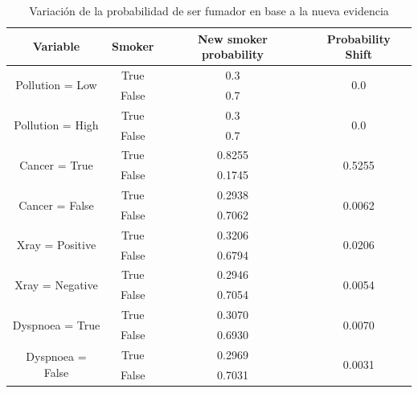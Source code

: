 \begin{table}[ht]
    \centering
    \begin{tabular}{|c|c|c|c|}
        \hline
        \textbf{Variable} & \textbf{Smoker} & \textbf{New smoker probability} & \textbf{Probability Shift} \\
        \hline
        \multirow{2}{*}{Pollution = Low} & True  & 0.3 & \multirow{2}{*}{0.0} \\
                                         & False & 0.7 & \\
        \hline
        \multirow{2}{*}{Pollution = High} & True  & 0.3 & \multirow{2}{*}{0.0} \\
                                          & False & 0.7 & \\
        \hline
        \multirow{2}{*}{Cancer = True} & True  & 0.8255 & \multirow{2}{*}{0.5255} \\
                                       & False & 0.1745 & \\
        \hline
        \multirow{2}{*}{Cancer = False} & True  & 0.2938 & \multirow{2}{*}{0.0062} \\
                                        & False & 0.7062 & \\
        \hline
        \multirow{2}{*}{Xray = Positive} & True  & 0.3206 & \multirow{2}{*}{0.0206} \\
                                         & False & 0.6794 & \\
        \hline
        \multirow{2}{*}{Xray = Negative} & True  & 0.2946 & \multirow{2}{*}{0.0054} \\
                                         & False & 0.7054 & \\
        \hline
        \multirow{2}{*}{Dyspnoea = True} & True  & 0.3070 & \multirow{2}{*}{0.0070} \\
                                         & False & 0.6930 & \\
        \hline
        \multirow{2}{*}{Dyspnoea = False} & True  & 0.2969 & \multirow{2}{*}{0.0031} \\
                                          & False & 0.7031 & \\
        \hline
    \end{tabular}
    \caption{Variación de la probabilidad de ser fumador en base a la nueva evidencia}
    \label{tab:phi_smoker_with_shift}
\end{table}

